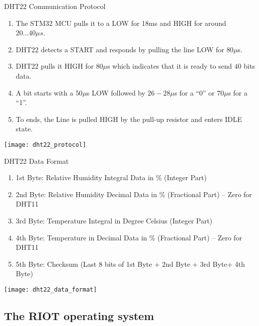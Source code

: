 \documentclass[aspectratio=169]{beamer}
\begin{document}
\begin{frame}{DHT22 Communication Protocol}
\begin{enumerate}

\item<1-> The STM32 MCU pulls it to a LOW for 18ms and HIGH for around $20 \ldots 40\mu s$.
\item<2-> DHT22 detects a START and responds by pulling the line LOW for $80\mu$s.
\item<3-> DHT22 pulls it HIGH for $80\mu$s which indicates that it is ready to send $40$ bits  data.
\item<4-> A bit starts with a $50 \mu$s LOW followed by $26-28\mu$s for a ``0'' or $70\mu$s for a ``1''.
\item<5> To ends, the Line is pulled HIGH by the pull-up resistor and enters IDLE state.

\end{enumerate}

\centering
\texttt{[image: dht22\_protocol]}
\end{frame}


\begin{frame}{DHT22 Data Format}
\begin{enumerate}

\item<1-> 1st Byte: Relative Humidity Integral Data in \% (Integer Part)
\item<2-> 2nd Byte: Relative Humidity Decimal Data in \% (Fractional Part) – Zero for DHT11
\item<3-> 3rd Byte: Temperature Integral in Degree Celsius (Integer Part)
\item<4-> 4th Byte: Temperature in Decimal Data in \% (Fractional Part) – Zero for DHT11
\item<5-> 5th Byte: Checksum (Last 8 bits of {1st Byte + 2nd Byte + 3rd Byte+ 4th Byte})

\end{enumerate}

\centering
\texttt{[image: dht22\_data\_format]}
\end{frame}






\subsection{The RIOT operating system}
\end{document}
